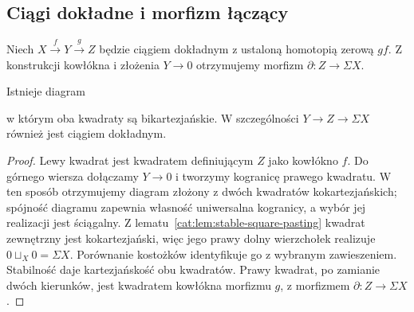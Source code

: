 \subsection{Ciągi dokładne i morfizm łączący}

Niech $X\xrightarrow{f}Y\xrightarrow{g}Z$ będzie ciągiem dokładnym z ustaloną homotopią zerową $gf$. Z konstrukcji kowłókna i złożenia $Y\to0$ otrzymujemy morfizm $\partial:Z\to\Sigma X$.

\begin{stwierdzenie}\label{cat:prop:stable-exact-rotation}
Istnieje diagram
\begin{center}
\end{center}
w którym oba kwadraty są bikartezjańskie. W szczególności $Y\to Z\to\Sigma X$ również jest ciągiem dokładnym.
\end{stwierdzenie}
\begin{proof}
Lewy kwadrat jest kwadratem definiującym $Z$ jako kowłókno $f$. Do górnego wiersza dołączamy $Y\to0$ i tworzymy kogranicę prawego kwadratu. W ten sposób otrzymujemy diagram złożony z dwóch kwadratów kokartezjańskich; spójność diagramu zapewnia własność uniwersalna kogranicy, a wybór jej realizacji jest ściągalny. Z lematu~\ref{cat:lem:stable-square-pasting} kwadrat zewnętrzny jest kokartezjański, więc jego prawy dolny wierzchołek realizuje $0\sqcup_X0=\Sigma X$. Porównanie kostożków identyfikuje go z wybranym zawieszeniem. Stabilność daje kartezjańskość obu kwadratów. Prawy kwadrat, po zamianie dwóch kierunków, jest kwadratem kowłókna morfizmu $g$, z morfizmem $\partial:Z\to\Sigma X$.
\end{proof}

